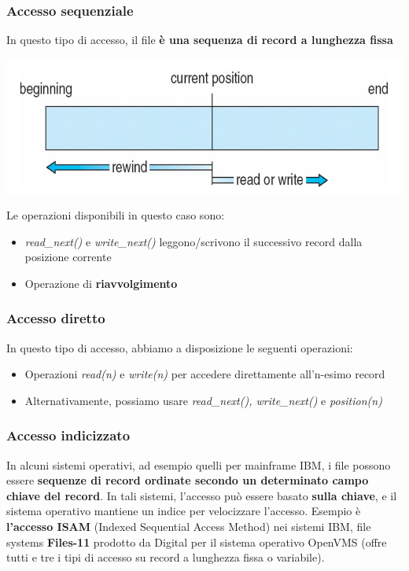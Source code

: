 \documentclass[12pt]{article}
\begin{document}
\subsubsection{Accesso sequenziale}
In questo tipo di accesso, il file \textbf{è una sequenza di record a lunghezza fissa}
\begin{center}
    \includegraphics[width = 0.50\linewidth]{Images/24.png}
\end{center}
Le operazioni disponibili in questo caso sono:
\begin{itemize}
    \item \textit{read\_next()} e \textit{write\_next()} leggono/scrivono il successivo record dalla posizione corrente
    \item Operazione di \textbf{riavvolgimento}
\end{itemize}
\subsubsection{Accesso diretto}
In questo tipo di accesso, abbiamo a disposizione le seguenti operazioni:
\begin{itemize}
    \item Operazioni \textit{read(n)} e \textit{write(n)} per accedere direttamente all'n-esimo record
    \item Alternativamente, possiamo usare \textit{read\_next(), write\_next()} e \textit{position(n)}
\end{itemize}
\subsubsection{Accesso indicizzato}
In alcuni sistemi operativi, ad esempio quelli per mainframe IBM, i file possono essere \textbf{sequenze di record ordinate secondo un determinato campo chiave del record}.
In tali sistemi, l'accesso può essere basato \textbf{sulla chiave}, e il sistema operativo mantiene un indice per velocizzare l'accesso. Esempio è \textbf{l'accesso ISAM} (Indexed Sequential Access Method) nei sistemi IBM,
file systems \textbf{Files-11} prodotto da Digital per il sistema operativo OpenVMS (offre tutti e tre i tipi di accesso su record a lunghezza fissa o variabile).
\end{document}
